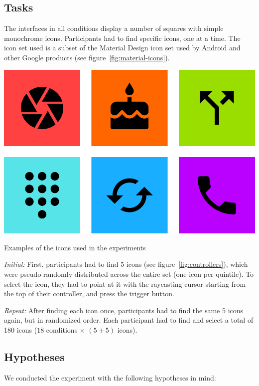 \documentclass{tufte-book} %
\begin{document}
\subsection{Tasks}
The interfaces in all conditions display a number of squares with simple monochrome icons. Participants had to find specific icons, one at a time. The icon set used is a subset of the Material Design icon set used by Android and other Google products (see figure~\ref{fig:material-icons}).

\begin{marginfigure}
  \includegraphics[width=\linewidth]{material-icons.png}
  \caption{Examples of the icons used in the experiments}
  \label{fig:material-icons}
\end{marginfigure}

\emph{Initial:} First, participants had to find 5 icons (see figure~\ref{fig:controllers}), which were pseudo-randomly distributed across the entire set (one icon per quintile). To select the icon, they had to point at it with the raycasting cursor starting from the top of their controller, and press the trigger button.

\emph{Repeat:} After finding each icon once, participants had to find the same 5 icons again, but in randomized order. Each participant had to find and select a total of 180 icons ($18$ conditions $\times$ $(5 + 5) $ icons).

\subsection{Hypotheses}
We conducted the experiment with the following hypotheses in mind:
\end{document}
